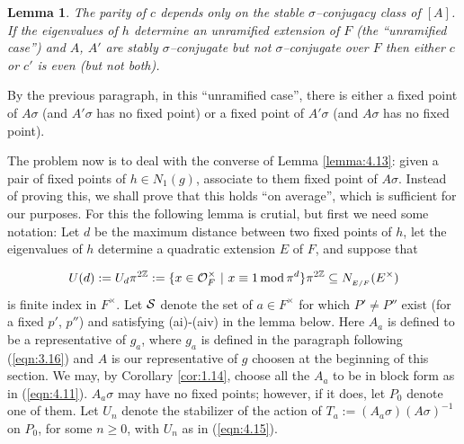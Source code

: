 \documentclass[12pt,letterpaper]{article}
\newtheorem{lemma}[theorem]{Lemma}
\def\zzz{\mathbb{Z}}
\def\off{{\cal O}_F}
\begin{document}
\begin{lemma}
\label{lemma:4.14}
The parity of $c$ depends only on the stable 
$\sigma$--conjugacy class of $[A]$. If the eigenvalues of $h$ determine an
unramified extension of $F$ (the ``unramified case'') and $A$, $A'$ are stably 
$\sigma$--conjugate but not
$\sigma$--conjugate over $F$ then either $c$ or $c'$ is even (but not both). 
\end{lemma}

By the previous paragraph, in this ``unramified case'', there is either 
a fixed point of $A\sigma$ (and $A'\sigma$ has no fixed point) or a
fixed point of $A'\sigma$ (and $A\sigma$ has no fixed point). 
 
The problem now is to deal with the converse of Lemma \ref{lemma:4.13}: 
given a pair of fixed points
of $h \in N_1(g)$, associate to them fixed point of $A\sigma$. Instead
of proving this, we shall prove that this holds ``on average'', which is
sufficient for our purposes.
For this the following lemma is crutial, but first we need some notation:
Let $d$ be the maximum distance
between two fixed points of $h$, let the eigenvalues of $h$
determine a quadratic extension $E$ of $F$, and suppose that

\begin{equation}
\label{eqn:4.15}
U(d):=U_d\pi^{2\zzz}:=
\{x\in\off^{\times}\ |\ x\equiv 1 \, {\rm mod}\, \pi^d\}\pi^{2\zzz}
\subseteq N_{_{E/F}}(E^{\times})
\end{equation}
is finite index in $F^{\times}$. Let ${\cal S}$ denote the set of 
$a\in F^{\times}$ for which
$P'\not= P''$ exist (for a fixed $p'$, $p''$) and satisfying (ai)-(aiv) in the 
lemma below. Here $A_a$ is defined to be a representative of $g_a$, where 
$g_a$ is defined in the paragraph following (\ref{eqn:3.16}) and $A$ is our
representative of $g$ choosen at the beginning of this section. We may,
by Corollary \ref{cor:1.14}, choose all the $A_a$ to be in block form as in 
(\ref{eqn:4.11}).
$A_a\sigma$ may have no
fixed points; however, if it does, let $P_0$ denote one of them. Let
$U_n$ denote the stabilizer of the action of 
$T_a :=(A_a\sigma )(A\sigma )^{-1}$ on $P_0$, for some $n\geq 0$, with
$U_n$ as in (\ref{eqn:4.15}).
\end{document}

